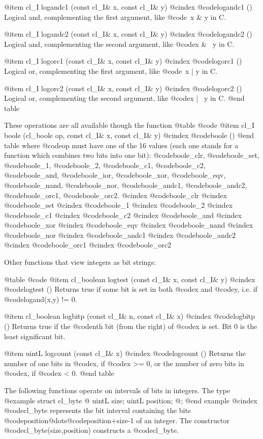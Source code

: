 @item cl_I logandc1 (const cl_I& x, const cl_I& y)
@cindex @code{logandc1 ()}
Logical and, complementing the first argument, like @code{~x & y} in C.

@item cl_I logandc2 (const cl_I& x, const cl_I& y)
@cindex @code{logandc2 ()}
Logical and, complementing the second argument, like @code{x & ~y} in C.

@item cl_I logorc1 (const cl_I& x, const cl_I& y)
@cindex @code{logorc1 ()}
Logical or, complementing the first argument, like @code{~x | y} in C.

@item cl_I logorc2 (const cl_I& x, const cl_I& y)
@cindex @code{logorc2 ()}
Logical or, complementing the second argument, like @code{x | ~y} in C.
@end table

These operations are all available though the function
@table @code
@item cl_I boole (cl_boole op, const cl_I& x, const cl_I& y)
@cindex @code{boole ()}
@end table
where @code{op} must have one of the 16 values (each one stands for a function
which combines two bits into one bit): @code{boole_clr}, @code{boole_set},
@code{boole_1}, @code{boole_2}, @code{boole_c1}, @code{boole_c2},
@code{boole_and}, @code{boole_ior}, @code{boole_xor}, @code{boole_eqv},
@code{boole_nand}, @code{boole_nor}, @code{boole_andc1}, @code{boole_andc2},
@code{boole_orc1}, @code{boole_orc2}.
@cindex @code{boole_clr}
@cindex @code{boole_set}
@cindex @code{boole_1}
@cindex @code{boole_2}
@cindex @code{boole_c1}
@cindex @code{boole_c2}
@cindex @code{boole_and}
@cindex @code{boole_xor}
@cindex @code{boole_eqv}
@cindex @code{boole_nand}
@cindex @code{boole_nor}
@cindex @code{boole_andc1}
@cindex @code{boole_andc2}
@cindex @code{boole_orc1}
@cindex @code{boole_orc2}


Other functions that view integers as bit strings:

@table @code
@item cl_boolean logtest (const cl_I& x, const cl_I& y)
@cindex @code{logtest ()}
Returns true if some bit is set in both @code{x} and @code{y}, i.e. if
@code{logand(x,y) != 0}.

@item cl_boolean logbitp (const cl_I& n, const cl_I& x)
@cindex @code{logbitp ()}
Returns true if the @code{n}th bit (from the right) of @code{x} is set.
Bit 0 is the least significant bit.

@item uintL logcount (const cl_I& x)
@cindex @code{logcount ()}
Returns the number of one bits in @code{x}, if @code{x} >= 0, or
the number of zero bits in @code{x}, if @code{x} < 0.
@end table

The following functions operate on intervals of bits in integers. 
The type
@example
struct cl_byte @{ uintL size; uintL position; @};
@end example
@cindex @code{cl_byte}
represents the bit interval containing the bits
@code{position}@dots{}@code{position+size-1} of an integer.
The constructor @code{cl_byte(size,position)} constructs a @code{cl_byte}.

